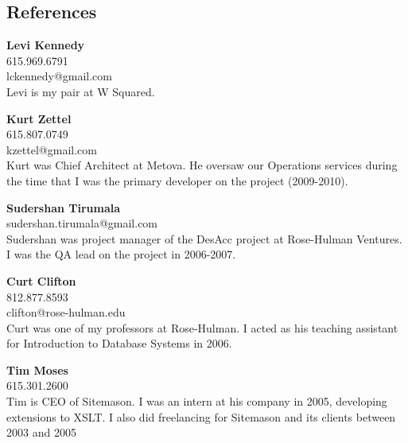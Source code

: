 \documentclass[line, margin, 10pt]{res}
\begin{document}
\renewcommand{\namefont}{ \LARGE \bf }

\address{elizabrock@gmail.com}
\address{(858) 205-9285}

\begin{resume}
\section{References}

{\bf Levi Kennedy} \\
615.969.6791\\
lckennedy@gmail.com\\
Levi is my pair at W Squared.

{\bf Kurt Zettel}\\
615.807.0749\\
kzettel@gmail.com\\
Kurt was Chief Architect at Metova.  He oversaw our Operations services during the time that I was the primary developer on the project (2009-2010).

{\bf Sudershan Tirumala}\\
sudershan.tirumala@gmail.com\\
Sudershan was project manager of the DesAcc project at Rose-Hulman Ventures.  I was the QA lead on the project in 2006-2007.

{\bf Curt Clifton}\\
812.877.8593\\
clifton@rose-hulman.edu\\
Curt was one of my professors at Rose-Hulman.  I acted as his teaching assistant for Introduction to Database Systems in 2006.

{\bf Tim Moses}\\
615.301.2600\\
Tim is CEO of Sitemason.  I was an intern at his company in 2005, developing extensions to XSLT.  I also did freelancing for Sitemason and its clients between 2003 and 2005

\end{resume}
\end{document}
